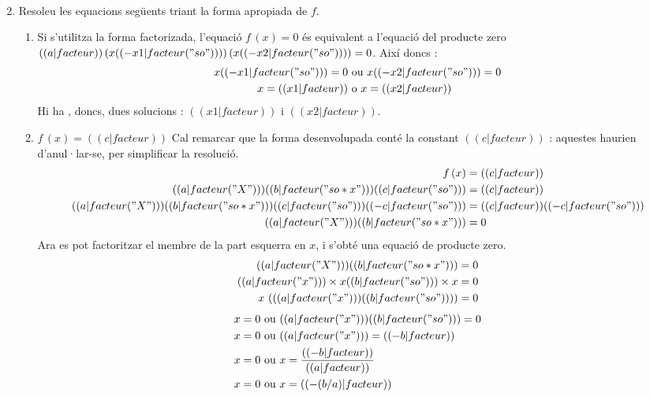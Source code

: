 \begin{enumerate}
\begin{enumerate}
\begin{align*}
        \end{align*}
\end{enumerate}
\item Resoleu les equacions següents triant la forma apropiada de $f$.
\begin{enumerate}
\item Si s'utilitza la forma factorizada, l'equació $f\,(x)=0$ és equivalent a l'equació del producte zero $(( a|facteur ))\,(x (( -x1|facteur("so") )) )\,(x (( -x2|facteur("so") )) ) = 0$. Així doncs :
\begin{align*}
x (( -x1|facteur("so") ))=0 &\text{ ou } x (( -x2|facteur("so") ))=0 \\
x=(( x1|facteur )) &\text{ o } x=(( x2|facteur ))
\end{align*}
Hi ha , doncs, dues solucions : $(( x1|facteur ))$ i $(( x2|facteur ))$.
\item $f\,(x)=(( c|facteur ))$ Cal remarcar que la forma desenvolupada conté la constant $(( c|facteur ))$ : aquestes haurien d'anul·lar-se, per simplificar la resolució.
\begin{align*}
f\,(x) &= (( c|facteur )) \\
(( a|facteur("X") )) (( b|facteur("so*x") )) (( c|facteur("so") )) &= (( c|facteur )) \\
(( a|facteur("X") )) (( b|facteur("so*x") )) (( c|facteur("so") )) (( -c|facteur("so") )) &= (( c|facteur )) (( -c|facteur("so") )) \\
(( a|facteur("X") )) (( b|facteur("so*x") )) &= 0 \\
\end{align*}
Ara es pot factoritzar el membre de la part esquerra en $x$, i s'obté una equació de producte zero.
\begin{align*}
(( a|facteur("X") )) (( b|facteur("so*x") )) &= 0 \\
(( a|facteur("x") ))\times{} x (( b|facteur("so") ))\times{} x &= 0 \\
x\,\left( (( a|facteur("x") )) (( b|facteur("so") )) \right) &= 0 \\
\end{align*}
\begin{align*}
x =0 &\text{ ou } (( a|facteur("x") )) (( b|facteur("so") ))=0 \\
x =0 &\text{ ou } (( a|facteur("x") )) =(( -b|facteur )) \\
x =0 &\text{ ou } x = \frac{(( -b|facteur ))}{(( a|facteur ))} \\
x =0 &\text{ ou } x = (( -(b/a)|facteur )) \\

\end{align*}
\end{enumerate}
\end{enumerate}
